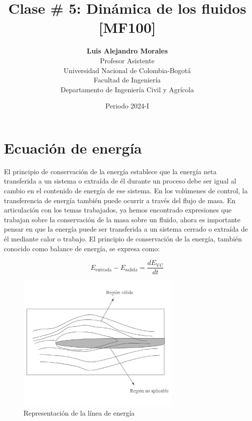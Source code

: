 \documentclass[10pt, oneside]{article}
\title{Clase \# 5: Dinámica de los fluidos [MF100]}
\author{\textbf{Luis Alejandro Morales}\\ \vspace{0.4cm} Profesor Asistente \\ Universidad Nacional de Colombia-Bogot\'a\\Facultad de Ingenier\'ia \\ Departamento de Ingeniería Civil y Agr\'icola}
\date{Periodo 2024-I}
\begin{document}
\maketitle
\tableofcontents

\vspace{.25in}

\section{Ecuación de energía}
El principio de conservación de la energía establece que la energía neta transferida a un sistema o extraída de él durante un proceso debe ser igual al cambio en el contenido de energía de ese sistema. En los volúmenes de control, la transferencia de energía también puede ocurrir a través del flujo de masa.
En articulación con los temas trabajados, ya hemos encontrado expresiones que trabajan sobre la conservación de la masa sobre un fluido, ahora es importante pensar en que la energía puede ser transferida a un sistema cerrado o extraída de él mediante calor o trabajo.  El principio de conservación de la energía, también conocido como balance de energía, se expresa como:

\begin{equation}
E_{\text{entrada}} - E_{\text{salida}} = \frac{dE_{\text{VC}}}{dt}
\label{patl}
\end{equation}

\begin{figure}[h]
\centering
\includegraphics[width=8cm]{Fig.1.jpg}
\caption{Representación de la línea de energía}
\label{eulan}
\end{figure}
\end{document}
